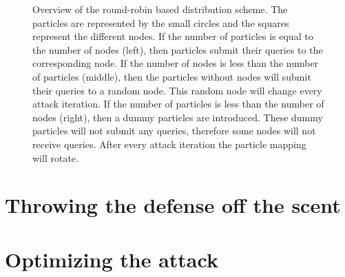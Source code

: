 \begin{figure}
\caption[Overview of the round-robin based distribution scheme]{Overview of the round-robin based distribution scheme. The particles are represented by the small circles and the squares represent the different nodes. If the number of particles is equal to the number of nodes (left), then particles submit their queries to the corresponding node. If the number of nodes is less than the number of particles (middle), then the particles without nodes will submit their queries to a random node. This random node will change every attack iteration. If the number of particles is less than the number of nodes (right), then a dummy particles are introduced. These dummy particles will not submit any queries, therefore some nodes will not receive queries. After every attack iteration the particle mapping will rotate.}
\label{fig:round_robin}
\end{figure}

\section{Throwing the defense off the scent}

\section{Optimizing the attack}
